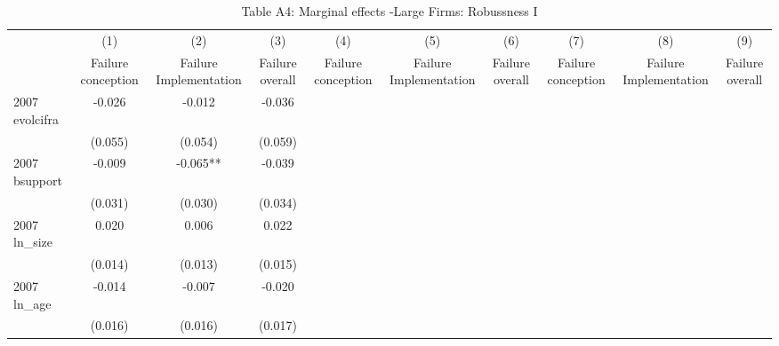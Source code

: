\begin{table}[htbp]\centering
\def\sym#1{\ifmmode^{#1}\else\(^{#1}\)\fi}
\caption{{Table A4: Marginal effects -Large Firms: Robussness I}}
\begin{tabular}{l*{9}{c}}
\hline\hline
                    &\multicolumn{1}{c}{(1)}&\multicolumn{1}{c}{(2)}&\multicolumn{1}{c}{(3)}&\multicolumn{1}{c}{(4)}&\multicolumn{1}{c}{(5)}&\multicolumn{1}{c}{(6)}&\multicolumn{1}{c}{(7)}&\multicolumn{1}{c}{(8)}&\multicolumn{1}{c}{(9)}\\
                    &\multicolumn{1}{c}{Failure conception}&\multicolumn{1}{c}{Failure Implementation}&\multicolumn{1}{c}{Failure overall}&\multicolumn{1}{c}{Failure conception}&\multicolumn{1}{c}{Failure Implementation}&\multicolumn{1}{c}{Failure overall}&\multicolumn{1}{c}{Failure conception}&\multicolumn{1}{c}{Failure Implementation}&\multicolumn{1}{c}{Failure overall}\\
\hline
2007 evolcifra      &      -0.026   &      -0.012   &      -0.036   &               &               &               &               &               &               \\
                    &     (0.055)   &     (0.054)   &     (0.059)   &               &               &               &               &               &               \\
2007 bsupport       &      -0.009   &      -0.065** &      -0.039   &               &               &               &               &               &               \\
                    &     (0.031)   &     (0.030)   &     (0.034)   &               &               &               &               &               &               \\
2007 ln\_size        &       0.020   &       0.006   &       0.022   &               &               &               &               &               &               \\
                    &     (0.014)   &     (0.013)   &     (0.015)   &               &               &               &               &               &               \\
2007 ln\_age         &      -0.014   &      -0.007   &      -0.020   &               &               &               &               &               &               \\
                    &     (0.016)   &     (0.016)   &     (0.017)   &               &               &               &               &               &               \\

\end{tabular}
\end{table}
